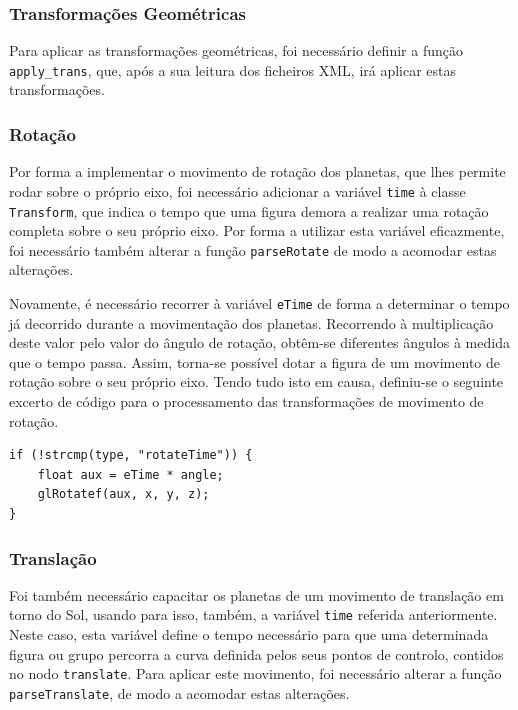 \documentclass[a4paper, 11pt]{article}
\begin{document}
\pagebreak

\subsubsection{Transformações Geométricas}

Para aplicar as transformações geométricas, foi necessário definir a função 
\texttt{apply\_trans}, que, após a sua leitura dos ficheiros XML, irá aplicar estas 
transformações.

\subsubsection*{Rotação}

Por forma a implementar o movimento de rotação dos planetas, que lhes permite rodar sobre o 
próprio eixo, foi necessário adicionar a variável \texttt{time} à classe \texttt{Transform}, 
que indica o tempo que uma figura demora a realizar uma rotação completa sobre o seu próprio 
eixo. Por forma a utilizar esta variável eficazmente, foi necessário também alterar a função 
\texttt{parseRotate} de modo a acomodar estas alterações.

Novamente, é necessário recorrer à variável \texttt{eTime} de forma a determinar o tempo já 
decorrido durante a movimentação dos planetas. Recorrendo à multiplicação deste valor pelo 
valor do ângulo de rotação, obtêm-se diferentes ângulos à medida que o tempo passa. Assim, 
torna-se possível dotar a figura de um movimento de rotação sobre o seu próprio eixo. Tendo 
tudo isto em causa, definiu-se o seguinte excerto de código para o processamento das 
transformações de movimento de rotação.

\begin{verbatim}
if (!strcmp(type, "rotateTime")) {
    float aux = eTime * angle;
    glRotatef(aux, x, y, z);
}
\end{verbatim}

\subsubsection*{Translação}

Foi também necessário capacitar os planetas de um movimento de translação em torno do Sol, 
usando para isso, também, a variável \texttt{time} referida anteriormente. Neste caso, esta 
variável define o tempo necessário para que uma determinada figura ou grupo percorra a curva 
definida pelos seus pontos de controlo, contidos no nodo \texttt{translate}. Para aplicar este 
movimento, foi necessário alterar a função \texttt{parseTranslate},
de modo a acomodar estas alterações.
\end{document}
